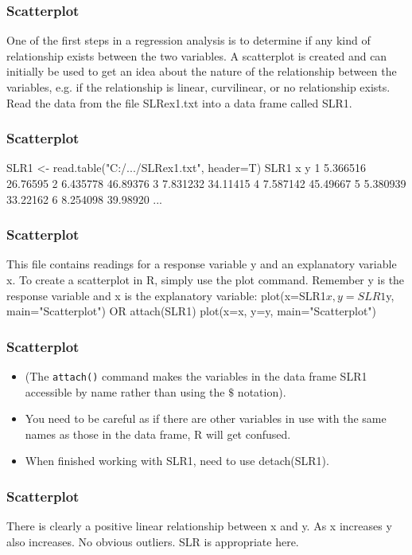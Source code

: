 
\begin{frame}[fragile]
\frametitle{Scatterplot}
One of the first steps in a regression analysis is to determine if any
kind of relationship exists between the two variables.
A scatterplot is created and can initially be used to get an idea
about the nature of the relationship between the variables, e.g. if
the relationship is linear, curvilinear, or no relationship exists.
Read the data from the file SLRex1.txt into a data frame called
SLR1.
\end{frame}
\begin{frame}[fragile]
\frametitle{Scatterplot}
SLR1 <- read.table("C:/.../SLRex1.txt", header=T)
SLR1
x y
1 5.366516 26.76595
2 6.435778 46.89376
3 7.831232 34.11415
4 7.587142 45.49667
5 5.380939 33.22162
6 8.254098 39.98920
...

\end{frame}
\begin{frame}[fragile]
\frametitle{Scatterplot}
This file contains readings for a response variable y and an
explanatory variable x.
To create a scatterplot in R, simply use the plot command.
Remember y is the response variable and x is the explanatory
variable:
plot(x=SLR1$x, y=SLR1$y, main="Scatterplot")
OR
attach(SLR1)
plot(x=x, y=y, main="Scatterplot")
\end{frame}
\begin{frame}[fragile]
\frametitle{Scatterplot}
\begin{itemize}
\item (The \texttt{attach()} command makes the variables in the data frame
SLR1 accessible by name rather than using the $\$$ notation). 
\item You need
to be careful as if there are other variables in use with the same
names as those in the data frame, R will get confused. 
\item When
finished working with SLR1, need to use detach(SLR1).
\end{itemize}
\end{frame}
\begin{frame}[fragile]
\frametitle{Scatterplot}
There is clearly a positive linear relationship between x and y. As x
increases y also increases. No obvious outliers. SLR is appropriate
here.
\end{frame}

